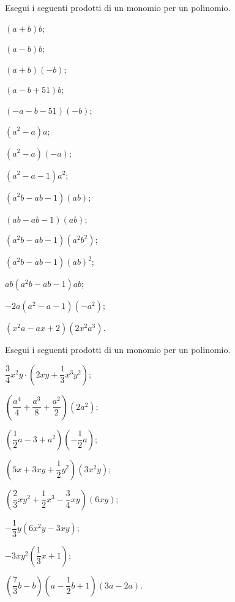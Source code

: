 \begin{esercizio}
\label{ese:11.18} %
 Esegui i seguenti prodotti di un monomio per un polinomio.
 \begin{multicols}{3}
\begin{enumeratea}
 \item $(a + b)b$;
 \item $(a - b)b$;
 \item $(a +b)(-b)$;
 \item $(a - b + 51)b$;
 \item $(-a - b -51)(-b)$;
 \item $(a^{2} - a)a$;
 \item $(a^{2} - a)(-a)$;
 \item $(a^{2}- a - 1)a^{2}$;
 \item $(a^{2}b-ab - 1)(ab)$;
 \item $(ab- ab - 1)(ab)$;
 \item $(a^{2}b- ab -1)(a^{2}b^{2})$;
 \item $(a^{2}b-ab - 1)(ab)^{2}$;
 \item $ab(a^{2}b- ab -1)ab$;
 \item $-2a(a^{2} - a - 1)(-a^{2})$;
 \item $(x^{2}a- ax+2)(2x^{2}a^{3})$.
\end{enumeratea}
\end{multicols}
\end{esercizio}

\begin{esercizio}
\label{ese:11.19} %
 Esegui i seguenti prodotti di un monomio per un polinomio.
 \begin{multicols}{2}
\begin{enumeratea}
 \item $\dfrac{3}{4}x^{2}y\cdot\left(2{xy}+\dfrac{1}{3}x^{3}y^{2}\right)$;
 \item $\left(\dfrac{a^{4}}{4}+\dfrac{a^{3}}{8}+\dfrac{a^{2}}{2}\right)\left(2a^{2}\right)$;
 \item $\left(\dfrac{1}{2}a-3+a^{2}\right)\left(-{\dfrac{1}{2}}a\right)$;
 \item $\left(5x+3{xy}+\dfrac{1}{2}y^{2}\right)\left(3x^{2}y\right)$;
 \item $\left(\dfrac{2}{3}xy^{2}+\dfrac{1}{2}x^{3}-\dfrac{3}{4}{xy}\right)(6{xy})$;
 \item $-\dfrac{1}{3}y\left(6x^{2}y-3{xy}\right)$;
 \item $-3xy^2\left(\dfrac{1}{3}x+1\right)$;
 \item $\left(\dfrac{7}{3}b-b\right)\left(a-\dfrac{1}{2}b+1\right)(3a-2a)$.
\end{enumeratea}
\end{multicols}
\end{esercizio}
